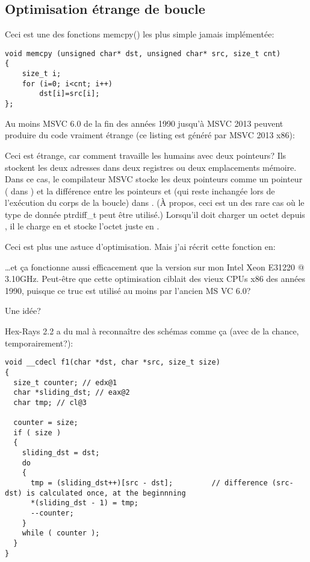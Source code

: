 \subsection{Optimisation étrange de boucle}

Ceci est une des fonctions memcpy() les plus simple jamais implémentée:

\begin{lstlisting}[style=customc]
void memcpy (unsigned char* dst, unsigned char* src, size_t cnt)
{
	size_t i;
	for (i=0; i<cnt; i++)
		dst[i]=src[i];
};
\end{lstlisting}

Au moins MSVC 6.0 de la fin des années 1990 jusqu'à MSVC 2013 peuvent produire du
code vraiment étrange (ce listing est généré par MSVC 2013 x86):



Ceci est étrange, car comment travaille les humains avec deux pointeurs? Ils stockent
les deux adresses dans deux registres ou deux emplacements mémoire.
Dans ce cas, le compilateur MSVC stocke les deux pointeurs comme un pointeur ( dans \EAX)
et la différence entre les pointeurs  et  (qui reste inchangée lors
de l'exécution du corps de la boucle) dans \ESI.
(À propos, ceci est un des rare cas où le type de donnée ptrdiff\_t peut être utilisé.)
Lorsqu'il doit charger un octet depuis , il le charge en 
et stocke l'octet juste en .

Ceci est plus une astuce d'optimisation. Mais j'ai récrit cette fonction en:



\dots et ça fonctionne aussi efficacement que la version  sur mon Intel
Xeon E31220 @ 3.10GHz.
Peut-être que cette optimisation ciblait des vieux CPUs x86 des années 1990, puisque
ce truc est utilisé au moins par l'ancien MS VC 6.0?

Une idée?

Hex-Rays 2.2 a du mal à reconnaître des schémas comme ça (avec de la chance, temporairement?):

\begin{lstlisting}[style=customc]
void __cdecl f1(char *dst, char *src, size_t size)
{
  size_t counter; // edx@1
  char *sliding_dst; // eax@2
  char tmp; // cl@3

  counter = size;
  if ( size )
  {
    sliding_dst = dst;
    do
    {
      tmp = (sliding_dst++)[src - dst];         // difference (src-dst) is calculated once, at the beginnning
      *(sliding_dst - 1) = tmp;
      --counter;
    }
    while ( counter );
  }
}
\end{lstlisting}

